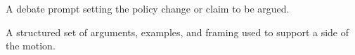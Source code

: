 
\begin{Definition}
A debate prompt setting the policy change or claim to be argued.
\end{Definition}

\begin{Definition}
A structured set of arguments, examples, and framing used to support a side of the motion.
\end{Definition}
